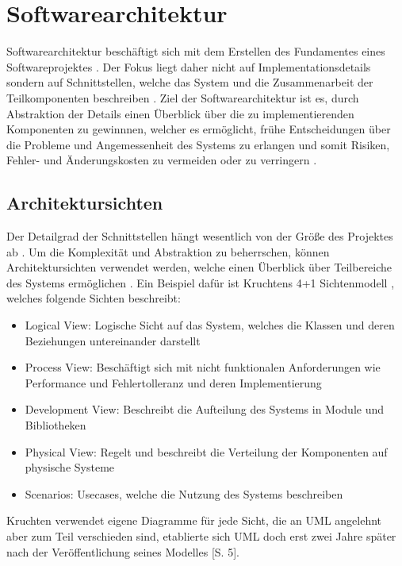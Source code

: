 \chapter{Softwarearchitektur}
Softwarearchitektur beschäftigt sich mit dem Erstellen des Fundamentes eines Softwareprojektes \cite[S. 9]{softarch}. Der Fokus liegt daher nicht auf Implementationsdetails sondern auf Schnittstellen, welche das System und die Zusammenarbeit der Teilkomponenten beschreiben \cite[S. 8]{basiswissen}. Ziel der Softwarearchitektur ist es, durch Abstraktion der Details einen Überblick über die zu implementierenden Komponenten zu gewinnnen, welcher es ermöglicht, frühe Entscheidungen über die Probleme und Angemessenheit des Systems zu erlangen und somit Risiken, Fehler- und Änderungskosten zu vermeiden oder zu verringern \cite[S. 10]{softarch}.

\section{Architektursichten}
Der Detailgrad der Schnittstellen hängt wesentlich von der Größe des Projektes ab \cite[S. 7-12]{basiswissen}. Um die Komplexität und Abstraktion zu beherrschen, können Architektursichten verwendet werden, welche einen Überblick über Teilbereiche des Systems ermöglichen \cite{ISO_ARCH}. Ein Beispiel dafür ist Kruchtens 4+1 Sichtenmodell \cite{kruch}, welches folgende Sichten beschreibt:

\begin{itemize}
  \item Logical View: Logische Sicht auf das System, welches die Klassen und deren Beziehungen untereinander darstellt
  \item Process View: Beschäftigt sich mit nicht funktionalen Anforderungen wie Performance und Fehlertolleranz und deren Implementierung
  \item Development View: Beschreibt die Aufteilung des Systems in Module und Bibliotheken
  \item Physical View: Regelt und beschreibt die Verteilung der Komponenten auf physische Systeme
  \item Scenarios: Usecases, welche die Nutzung des Systems beschreiben
\end{itemize}

Kruchten verwendet eigene Diagramme für jede Sicht, die an UML angelehnt aber zum Teil verschieden sind, etablierte sich UML doch erst zwei Jahre später nach der Veröffentlichung seines Modelles \cite{glasklar}[S. 5].

